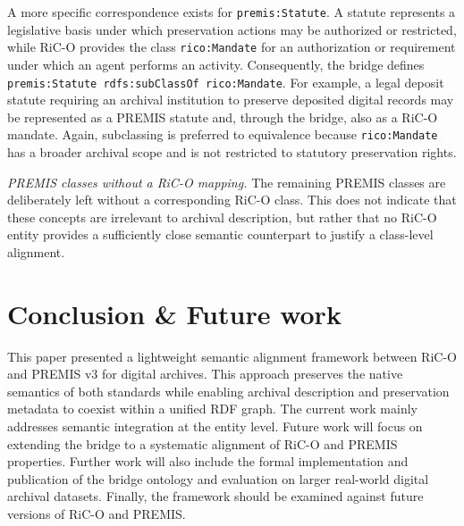 \documentclass[runningheads]{llncs}
\begin{document}
A more specific correspondence exists for \texttt{premis:Statute}. A statute
represents a legislative basis under which preservation actions may be
authorized or restricted, while RiC-O provides the class
\texttt{rico:Mandate} for an authorization or requirement under which an agent
performs an activity. Consequently, the bridge defines
\texttt{premis:Statute rdfs:subClassOf rico:Mandate}. For example, a legal
deposit statute requiring an archival institution to preserve deposited digital
records may be represented as a PREMIS statute and, through the bridge, also as
a RiC-O mandate. Again, subclassing is preferred to equivalence because
\texttt{rico:Mandate} has a broader archival scope and is not restricted to
statutory preservation rights.

\emph{PREMIS classes without a RiC-O mapping.}
The remaining PREMIS classes are deliberately left without a corresponding
RiC-O class. This does not indicate that these concepts are irrelevant to
archival description, but rather that no RiC-O entity provides a sufficiently
close semantic counterpart to justify a class-level alignment. 




\section{Conclusion \& Future work}
\label{sec:conclusion}
This paper presented a lightweight semantic alignment framework between RiC-O and PREMIS v3 for digital archives. 
This approach preserves the native semantics of both standards while enabling archival description and preservation metadata to coexist within a unified RDF graph.
%
The current work mainly addresses semantic integration at the entity level. Future work will focus on extending the bridge to a systematic alignment of RiC-O and PREMIS properties.
Further work will also include the formal implementation and publication of the bridge ontology
and evaluation on larger real-world digital archival datasets. Finally, the framework should be examined against future versions of RiC-O and PREMIS.
%
%
 
 
\end{document}
